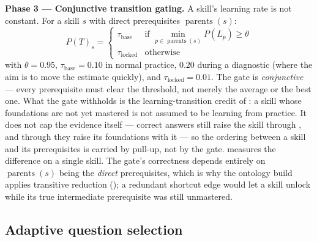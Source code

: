 

\textbf{Phase 3 --- Conjunctive transition gating.} A skill's learning rate is
not constant. For a skill $s$ with direct prerequisites
$\operatorname{parents}(s)$:
\begin{equation}
  P(T)_s =
  \begin{cases}
    \tau_{\text{base}} & \text{if } \min_{p \in \operatorname{parents}(s)} P(L_p) \ge \theta \\[1mm]
    \tau_{\text{locked}} & \text{otherwise}
  \end{cases}
  \label{eq:gating}
\end{equation}
with $\theta = 0.95$, $\tau_{\text{base}} = 0.10$ in normal practice,
$0.20$ during a diagnostic (where the aim is to move the estimate quickly), and
$\tau_{\text{locked}} = 0.01$. The gate is \emph{conjunctive} --- every
prerequisite must clear the threshold, not merely the average or the best one.
What the gate withholds is the learning-transition credit of
: a skill whose foundations are not yet mastered is not
assumed to be learning from practice. It does not cap the evidence itself ---
correct answers still raise the skill through , and
through  they raise its foundations with it --- so the ordering
between a skill and its prerequisites is carried by pull-up, not by the gate.
 measures the difference on a single skill. The gate's
correctness depends entirely on $\operatorname{parents}(s)$ being the
\emph{direct} prerequisites, which is why the ontology build applies transitive
reduction (); a redundant shortcut edge would let a
skill unlock while its true intermediate prerequisite was still unmastered.



\subsection{Adaptive question selection}

